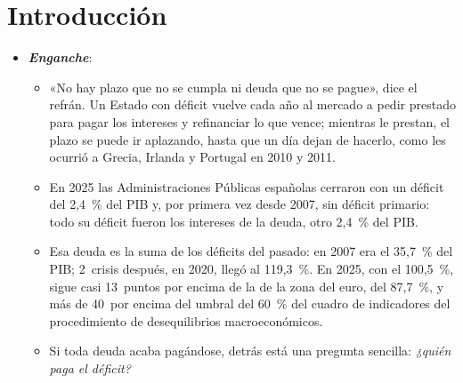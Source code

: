 \documentclass[11pt]{article}
\begin{document}
\tceetitulo

\section*{Introducción}

\begin{itemize}
\item \textbf{\emph{Enganche}}:
  \begin{itemize}
  \item «No hay plazo que no se cumpla ni deuda que no se pague», dice el refrán. Un Estado con déficit vuelve cada año al mercado a pedir prestado para pagar los intereses y refinanciar lo que vence; mientras le prestan, el plazo se puede ir aplazando, hasta que un día dejan de hacerlo, como les ocurrió a Grecia, Irlanda y Portugal en 2010 y 2011\nocite{DeGrauwe2011Governance}.
  \item En 2025 las Administraciones Públicas españolas cerraron con un déficit del 2,4~\% del PIB y, por primera vez desde 2007, sin déficit primario: todo su déficit fueron los intereses de la deuda, otro 2,4~\% del PIB\nocite{Eurostat2026EDP,Hacienda2026Deficit2025}.
  \item Esa deuda es la suma de los déficits del pasado: en 2007 era el 35,7~\% del PIB; 2~crisis después, en 2020, llegó al 119,3~\%. En 2025, con el 100,5~\%, sigue casi 13~puntos por encima de la de la zona del euro, del 87,7~\%\nocite{Eurostat2026EDP}, y más de 40~por encima del umbral del 60~\% del cuadro de indicadores del procedimiento de desequilibrios macroeconómicos\nocite{CE2026CuadroPDM}.
  \item Si toda deuda acaba pagándose, detrás está una pregunta sencilla: \emph{¿quién paga el déficit?}
  \end{itemize}


\end{itemize}
\end{document}
